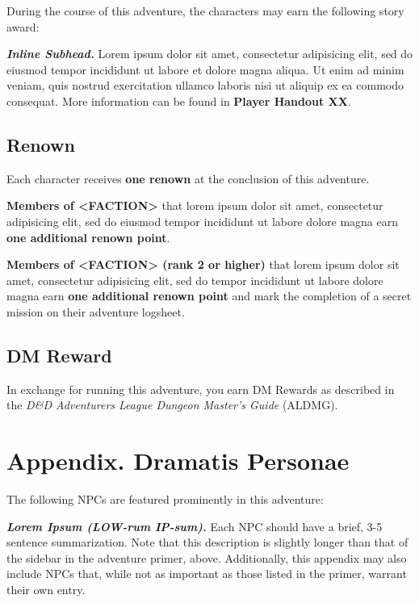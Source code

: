 During the course of this adventure, the characters may earn the
following story award:

\emph{\textbf{Inline Subhead.}} Lorem ipsum dolor sit amet, consectetur
adipisicing elit, sed do eiusmod tempor incididunt ut labore et dolore
magna aliqua. Ut enim ad minim veniam, quis nostrud exercitation ullamco
laboris nisi ut aliquip ex ea commodo consequat. More information can be
found in \textbf{Player Handout XX}.

\subsection{Renown}\label{renown}

Each character receives \textbf{one renown} at the conclusion of this
adventure.

\textbf{Members of \textless{}FACTION\textgreater{}} that lorem ipsum
dolor sit amet, consectetur adipisicing elit, sed do eiusmod tempor
incididunt ut labore dolore magna earn \textbf{one additional renown
point}.

\textbf{Members of \textless{}FACTION\textgreater{} (rank 2 or higher)}
that lorem ipsum dolor sit amet, consectetur adipisicing elit, sed do
tempor incididunt ut labore dolore magna earn \textbf{one additional
renown point} and mark the completion of a secret mission on their
adventure logsheet.

\subsection{DM Reward}\label{dm-reward}

In exchange for running this adventure, you earn DM Rewards as described
in the \emph{D\&D Adventurers League Dungeon Master's Guide} (ALDMG).

\section{Appendix. Dramatis Personae}\label{appendix.-dramatis-personae}

The following NPCs are featured prominently in this adventure:

\emph{\textbf{Lorem Ipsum (LOW-rum IP-sum).}} Each NPC should have a
brief, 3-5 sentence summarization. Note that this description is
slightly longer than that of the sidebar in the adventure primer, above.
Additionally, this appendix may also include NPCs that, while not as
important as those listed in the primer, warrant their own entry.

